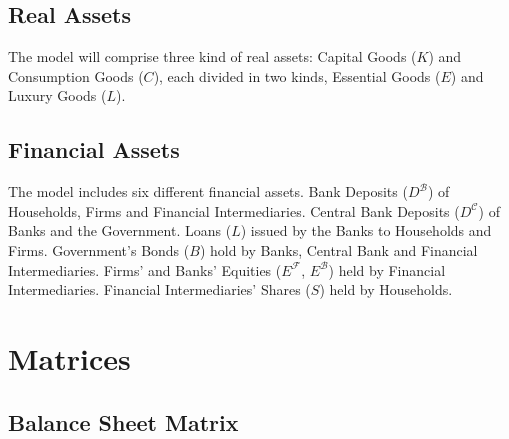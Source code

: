 \documentclass[a4paper, headings=standardclasses]{scrartcl}
\begin{document}
\subsection{Real Assets}
The model will comprise three kind of real assets: Capital Goods ($K$) and Consumption Goods ($C$), each divided in two kinds, Essential Goods ($E$) and Luxury Goods ($L$).

\subsection{Financial Assets}
The model includes six different financial assets. 
Bank Deposits ($D^\mathcal{B}$) of Households, Firms and Financial Intermediaries. 
Central Bank Deposits ($D^\mathcal{C}$) of Banks and the Government. 
Loans ($L$) issued by the Banks to Households and Firms. Government's Bonds ($B$) hold by Banks, Central Bank and Financial Intermediaries. 
Firms' and Banks' Equities ($E^\mathcal{F}$, $E^\mathcal{B}$) held by Financial Intermediaries.
Financial Intermediaries' Shares ($S$) held by Households.

\section{Matrices}
\subsection{Balance Sheet Matrix}
\end{document}
